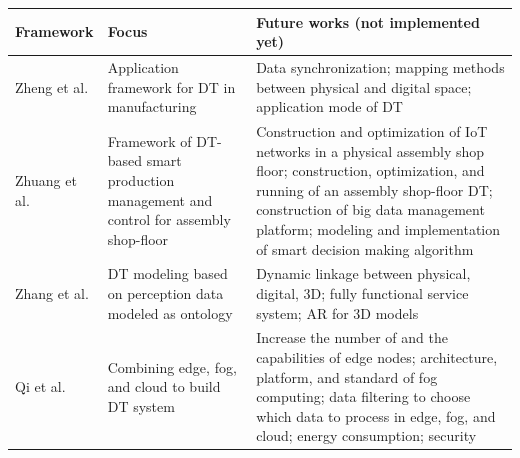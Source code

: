 \documentclass[article,table]{aaltoseries}
\begin{document}
\begin{table}[]
	\begin{tabular}{|l|p{4.5cm}|p{7.3cm}|}
		\hline
		\rowcolor[HTML]{C0C0C0} 
		Framework                                                                    & Focus                                                                                 & Future works (not implemented yet)                                                                                                                                                                                                                                  \\ \hline
		Zheng et al. \cite{zheng2019application}                                                         & Application framework for DT in manufacturing                                         & Data synchronization; mapping methods between physical and digital space; application mode of DT                                                                                                                                                                    \\ \hline
		Zhuang et al. \cite{Zhuang2018}                                                                   & Framework of DT-based smart production management and control for assembly shop-floor & Construction and optimization of IoT networks in a physical assembly shop floor; construction, optimization, and running of an assembly shop-floor DT; construction of big data management platform; modeling and implementation of smart decision making algorithm \\ \hline
		Zhang et al. \cite{Zhang2017}                                                                    & DT modeling based on perception data modeled as ontology                              & Dynamic linkage between physical, digital, 3D; fully functional service system; AR for 3D models                                                                                                                                                                    \\ \hline
		Qi et al. \cite{qi2018modeling}                                                               & Combining edge, fog, and cloud to build DT system                                     & Increase the number of and the capabilities of edge nodes; architecture, platform, and standard of fog computing; data filtering to choose which data to process in edge, fog, and cloud; energy consumption; security                                               \\ \hline

\end{tabular}
\end{table}
\end{document}
